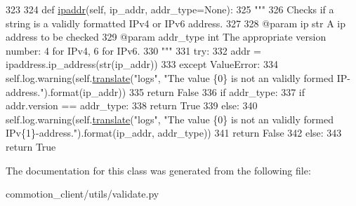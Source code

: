 \begin{DoxyCode}
323 
324     \textcolor{keyword}{def }\hyperlink{classcommotion__client_1_1utils_1_1validate_1_1Networking_aaeee5dedbe589a997ddf820b17359c35}{ipaddr}(self, ip\_addr, addr\_type=None):
325         \textcolor{stringliteral}{"""}
326 \textcolor{stringliteral}{        Checks if a string is a validly formatted IPv4 or IPv6 address.}
327 \textcolor{stringliteral}{}
328 \textcolor{stringliteral}{        @param ip str A ip address to be checked}
329 \textcolor{stringliteral}{        @param addr\_type int The appropriate version number: 4 for IPv4, 6 for IPv6.}
330 \textcolor{stringliteral}{        """}
331         \textcolor{keywordflow}{try}:
332             addr = ipaddress.ip\_address(str(ip\_addr))
333         \textcolor{keywordflow}{except} ValueError:
334             self.log.warning(self.\hyperlink{classcommotion__client_1_1utils_1_1validate_1_1Networking_a2728d53728c499c4da34412a8b773216}{translate}(\textcolor{stringliteral}{"logs"}, \textcolor{stringliteral}{"The value \{0\} is not an validly formed
       IP-address."}).format(ip\_addr))
335             \textcolor{keywordflow}{return} \textcolor{keyword}{False}
336         \textcolor{keywordflow}{if} addr\_type:
337             \textcolor{keywordflow}{if} addr.version == addr\_type:
338                 \textcolor{keywordflow}{return} \textcolor{keyword}{True}
339             \textcolor{keywordflow}{else}:
340                 self.log.warning(self.\hyperlink{classcommotion__client_1_1utils_1_1validate_1_1Networking_a2728d53728c499c4da34412a8b773216}{translate}(\textcolor{stringliteral}{"logs"}, \textcolor{stringliteral}{"The value \{0\} is not an validly formed
       IPv\{1\}-address."}).format(ip\_addr, addr\_type))
341                 \textcolor{keywordflow}{return} \textcolor{keyword}{False}
342         \textcolor{keywordflow}{else}:
343             \textcolor{keywordflow}{return} \textcolor{keyword}{True}
\end{DoxyCode}


The documentation for this class was generated from the following file\+:\begin{DoxyCompactItemize}
\item 
commotion\+\_\+client/utils/validate.\+py\end{DoxyCompactItemize}
